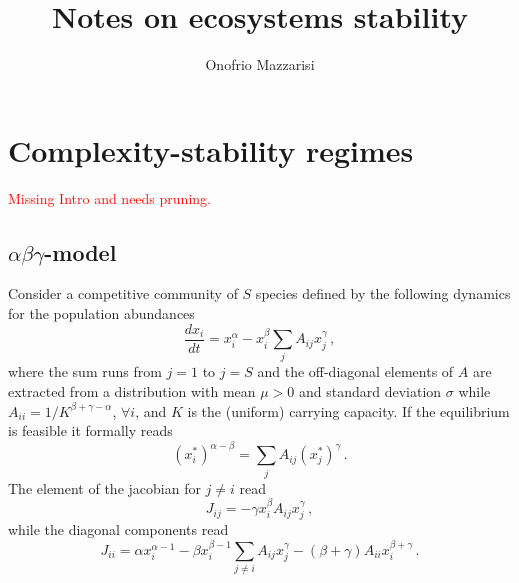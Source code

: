 \documentclass[10pt]{article}
\title{{\bf Notes on ecosystems stability}}
\author{Onofrio Mazzarisi}
\begin{document}


\maketitle

\section{Complexity-stability regimes}
\label{sec: complexity-stability regimes}
\textcolor{red}{Missing Intro and needs pruning.}

\subsection{$\alpha\beta\gamma$-model}

Consider a competitive community of $S$ species
defined by the following dynamics for the population abundances
\begin{equation}
    \frac{dx_i}{dt}=x_i^{\alpha}-x_i^{\beta}\sum_{j}A_{ij}x_j^{\gamma} \, ,
\end{equation}
where the sum runs from $j=1$ to $j=S$ and the off-diagonal elements
of $A$ are extracted from a distribution
with mean $\mu>0$ and standard deviation $\sigma$ while $A_{ii}=1/K^{\beta+\gamma-\alpha}$, $\forall i$,
and $K$ is the (uniform) carrying capacity.
If the equilibrium is feasible it formally reads
\begin{equation}
    (x_i^*)^{\alpha-\beta} = \sum_{j}A_{ij}(x_j^*)^{\gamma} \, .
\end{equation}
The element of the jacobian for $j\neq i$ read
\begin{equation}
    J_{ij} = -\gamma x_i^{\beta}A_{ij}x_j^{\gamma} \, ,
\end{equation}
while the diagonal components read
\begin{equation}
    J_{ii} = \alpha x_i^{\alpha-1}-\beta x_i^{\beta-1}\sum_{j\neq i}A_{ij}x_j^{\gamma}
    - (\beta+\gamma)A_{ii}x_i^{\beta+\gamma} \, .
\end{equation}
\end{document}
